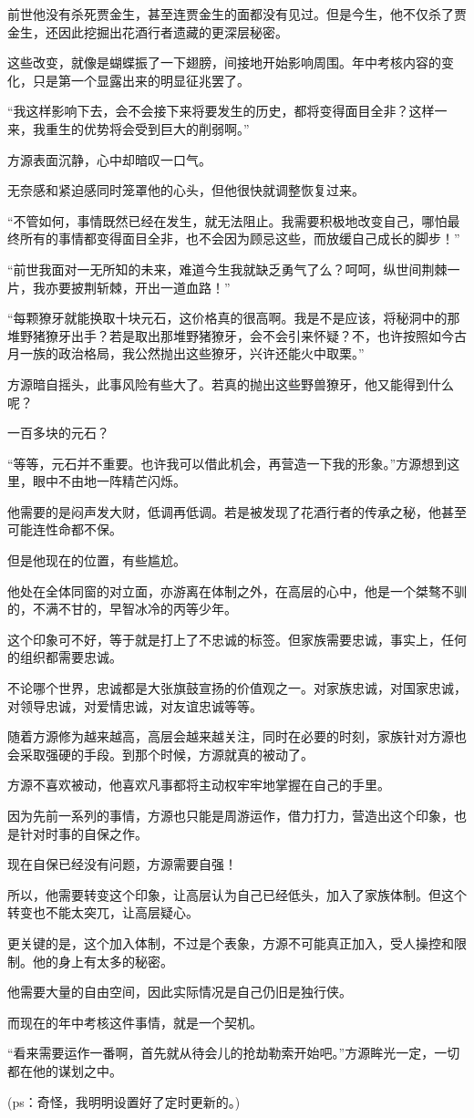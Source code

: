 \begin{this_body}
前世他没有杀死贾金生，甚至连贾金生的面都没有见过。但是今生，他不仅杀了贾金生，还因此挖掘出花酒行者遗藏的更深层秘密。

这些改变，就像是蝴蝶振了一下翅膀，间接地开始影响周围。年中考核内容的变化，只是第一个显露出来的明显征兆罢了。

“我这样影响下去，会不会接下来将要发生的历史，都将变得面目全非？这样一来，我重生的优势将会受到巨大的削弱啊。”

方源表面沉静，心中却暗叹一口气。

无奈感和紧迫感同时笼罩他的心头，但他很快就调整恢复过来。

“不管如何，事情既然已经在发生，就无法阻止。我需要积极地改变自己，哪怕最终所有的事情都变得面目全非，也不会因为顾忌这些，而放缓自己成长的脚步！”

“前世我面对一无所知的未来，难道今生我就缺乏勇气了么？呵呵，纵世间荆棘一片，我亦要披荆斩棘，开出一道血路！”

“每颗獠牙就能换取十块元石，这价格真的很高啊。我是不是应该，将秘洞中的那堆野猪獠牙出手？若是取出那堆野猪獠牙，会不会引来怀疑？不，也许按照如今古月一族的政治格局，我公然抛出这些獠牙，兴许还能火中取栗。”

方源暗自摇头，此事风险有些大了。若真的抛出这些野兽獠牙，他又能得到什么呢？

一百多块的元石？

“等等，元石并不重要。也许我可以借此机会，再营造一下我的形象。”方源想到这里，眼中不由地一阵精芒闪烁。

他需要的是闷声发大财，低调再低调。若是被发现了花酒行者的传承之秘，他甚至可能连性命都不保。

但是他现在的位置，有些尴尬。

他处在全体同窗的对立面，亦游离在体制之外，在高层的心中，他是一个桀骜不驯的，不满不甘的，早智冰冷的丙等少年。

这个印象可不好，等于就是打上了不忠诚的标签。但家族需要忠诚，事实上，任何的组织都需要忠诚。

不论哪个世界，忠诚都是大张旗鼓宣扬的价值观之一。对家族忠诚，对国家忠诚，对领导忠诚，对爱情忠诚，对友谊忠诚等等。

随着方源修为越来越高，高层会越来越关注，同时在必要的时刻，家族针对方源也会采取强硬的手段。到那个时候，方源就真的被动了。

方源不喜欢被动，他喜欢凡事都将主动权牢牢地掌握在自己的手里。

因为先前一系列的事情，方源也只能是周游运作，借力打力，营造出这个印象，也是针对时事的自保之作。

现在自保已经没有问题，方源需要自强！

所以，他需要转变这个印象，让高层认为自己已经低头，加入了家族体制。但这个转变也不能太突兀，让高层疑心。

更关键的是，这个加入体制，不过是个表象，方源不可能真正加入，受人操控和限制。他的身上有太多的秘密。

他需要大量的自由空间，因此实际情况是自己仍旧是独行侠。

而现在的年中考核这件事情，就是一个契机。

“看来需要运作一番啊，首先就从待会儿的抢劫勒索开始吧。”方源眸光一定，一切都在他的谋划之中。

(ps：奇怪，我明明设置好了定时更新的。)

\end{this_body}

